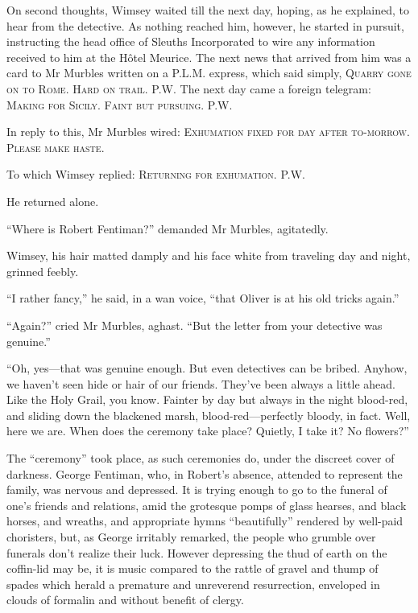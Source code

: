 On second thoughts, Wimsey waited till the next day, hoping, as he explained, to hear from the detective. As nothing reached him, however, he started in pursuit, instructing the head office of Sleuths Incorporated to wire any information received to him at the Hôtel Meurice. The next news that arrived from him was a card to Mr Murbles written on a P.L.M. express, which said simply, \textsc{Quarry gone on to Rome. Hard on trail. P.W.} The next day came a foreign telegram: \textsc{Making for Sicily. Faint but pursuing. P.W.}

In reply to this, Mr Murbles wired: \textsc{Exhumation fixed for day after to-morrow. Please make haste.}

To which Wimsey replied: \textsc{Returning for exhumation. P.W.}

He returned alone.

\enquote{Where is Robert Fentiman?} demanded Mr Murbles, agitatedly.

Wimsey, his hair matted damply and his face white from traveling day and night, grinned feebly.

\enquote{I rather fancy,} he said, in a wan voice, \enquote{that Oliver is at his old tricks again.}

\enquote{Again?} cried Mr Murbles, aghast. \enquote{But the letter from your detective was genuine.}

\enquote{Oh, yes\allowbreak---\allowbreak that was genuine enough. But even detectives can be bribed. Anyhow, we haven't seen hide or hair of our friends. They've been always a little ahead. Like the Holy Grail, you know. Fainter by day but always in the night blood-red, and sliding down the blackened marsh, blood-red\allowbreak---\allowbreak perfectly bloody, in fact. Well, here we are. When does the ceremony take place? Quietly, I take it? No flowers?}

The \enquote{ceremony} took place, as such ceremonies do, under the discreet cover of darkness. George Fentiman, who, in Robert's absence, attended to represent the family, was nervous and depressed. It is trying enough to go to the funeral of one's friends and relations, amid the grotesque pomps of glass hearses, and black horses, and wreaths, and appropriate hymns \enquote{beautifully} rendered by well-paid choristers, but, as George irritably remarked, the people who grumble over funerals don't realize their luck. However depressing the thud of earth on the coffin-lid may be, it is music compared to the rattle of gravel and thump of spades which herald a premature and unreverend resurrection, enveloped in clouds of formalin and without benefit of clergy.

